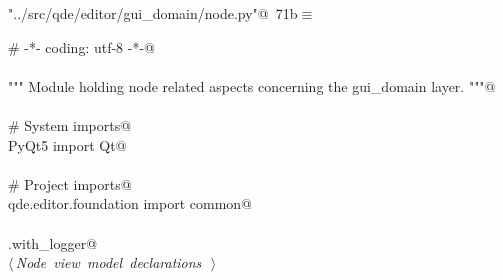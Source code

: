 \documentclass[
    a4paper,      %
    10pt,         %
    openright,    %
    notitlepage,  %
    parskip=half, %
]{scrreprt}       %
\theoremstyle{definition}                    %
\begin{document}
\begin{flushleft} \small
\begin{minipage}{\linewidth}\label{scrap123}\raggedright\small
{} \verb@"../src/qde/editor/gui_domain/node.py"@\nobreak\ {\footnotesize {71b}}$\equiv$
\vspace{-1ex}
\begin{list}{}{} \item
\mbox{}\lstinline@# -*- coding: utf-8 -*-@\\
\mbox{}\lstinline@@\\
\mbox{}\lstinline@""" Module holding node related aspects concerning the gui_domain layer. """@\\
\mbox{}\lstinline@@\\
\mbox{}\lstinline@# System imports@\\
\mbox{}\lstinline@from PyQt5 import Qt@\\
\mbox{}\lstinline@@\\
\mbox{}\lstinline@# Project imports@\\
\mbox{}\lstinline@from qde.editor.foundation import common@\\
\mbox{}\lstinline@@\\
\mbox{}\lstinline@common.with_logger@\\
\mbox{}\lstinline@@\hbox{$\langle\,${\itshape Node view model declarations}\nobreak\ {\footnotesize {}}$\,\rangle$}\lstinline@@\\
\mbox{}\lstinline@@{\NWsep}
\end{list}
\vspace{-1.5ex}
\footnotesize
\begin{list}{}{\setlength{\itemsep}{-\parsep}\setlength{\itemindent}{-\leftmargin}}

\item{}
\end{list}
\end{minipage}\vspace{4ex}
\end{flushleft}
\end{document}

